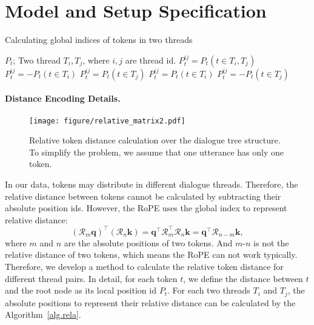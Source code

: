 \documentclass[11pt]{article}
\begin{document}



\newpage

\appendix

\clearpage

\appendix

\section{Model and Setup Specification}

\begin{algorithm}[h]
	\caption{Calculating global indices of tokens in two threads} 
	\label{alg.rela} 
	\begin{algorithmic}
	    \REQUIRE $P_t$; Two thread $T_i,T_j$, where $i,j$ are thread id.
	    \STATE $P^{ij}_t=P_t(t\in {T_i,T_j})$
	    \STATE $P^{ij}_t=-P_t(t\in {T_i})$
	    \STATE $P^{ij}_t=P_t(t\in {T_j})$
	    \ELSE
	    \STATE $P^{ij}_t=P_t(t\in {T_i})$
	    \STATE $P^{ij}_t=-P_t(t\in {T_j})$
	   \ENDIF
		
	\end{algorithmic} 
\end{algorithm}

\paragraph{Distance Encoding Details.}
\label{app:rope_detail}

\begin{figure}[!ht]
  \centering
  \texttt{[image: figure/relative\_matrix2.pdf]}
  \caption{
Relative token distance calculation over the dialogue tree structure.
To simplify the problem, we assume that one utterance has only one token.
}
  \label{fig:distance_matrix}
  \end{figure}
  
In our data, tokens may distribute in different dialogue threads. 
Therefore, the relative distance between tokens cannot be calculated by subtracting their absolute position ids.
However, the RoPE uses the global index to represent relative distance:
\begin{equation}\nonumber
(\boldsymbol{\mathcal{R}}_m \boldsymbol{q})^{\top}(\boldsymbol{\mathcal{R}}_n \boldsymbol{k}) =  \boldsymbol{q}^{\top} \boldsymbol{\mathcal{R}}_m^{\top}\boldsymbol{\mathcal{R}}_n \boldsymbol{k} = \boldsymbol{q}^{\top} \boldsymbol{\mathcal{R}}_{n-m} \boldsymbol{k},
\end{equation}
where $m$ and $n$ are the absolute positions of two tokens.
And $m\text{-}n$ is not the relative distance of two tokens, which means the RoPE can not work typically.
Therefore, we develop a method to calculate the relative token distance for different thread pairs.
In detail, for each token $t$, we define the distance between $t$ and the root node as its local position id $P_t$.
For each two threads $T_i$ and $T_j$, the absolute positions to represent their relative distance can be calculated by the Algorithm~\ref{alg.rela}.
\end{document}
